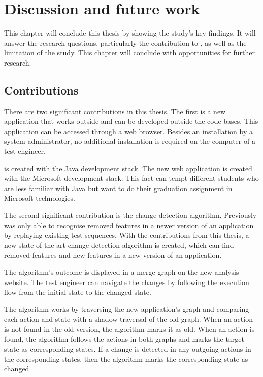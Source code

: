 \chapter{Discussion and future work} \label{chapter:disussion-conclusion-future-work}
This chapter will conclude this thesis by showing the study's key findings. It will answer the research questions, particularly the contribution to \testar, as well as the limitation of the study. This chapter will conclude with opportunities for further research. 

\section{Contributions}
There are two significant contributions in this thesis. The first is a new application that works outside and can be developed outside the \testar code bases. This application can be accessed through a web browser. Besides an installation by a system administrator, no additional installation is required on the computer of a test engineer. 

\testar is created with the Java development stack. The new web application is created with the Microsoft development stack. This fact can tempt different students who are less familiar with Java but want to do their graduation assignment in Microsoft technologies. 

The second significant contribution is the change detection algorithm. Previously \testar was only able to recognise removed features in a newer version of an application by replaying existing test sequences. With the contributions from this thesis, a new state-of-the-art change detection algorithm is created, which can find removed features and new features in a new version of an application. 

The algorithm's outcome is displayed in a merge graph on the new analysis website. The test engineer can navigate the changes by following the execution flow from the initial state to the changed state.

The algorithm works by traversing the new application's graph and comparing each action and state with a shadow traversal of the old graph. When an action is not found in the old version, the algorithm marks it as old. When an action is found, the algorithm follows the actions in both graphs and marks the target state as corresponding states. If a change is detected in any outgoing actions in the corresponding states, then the algorithm marks the corresponding state as changed.

